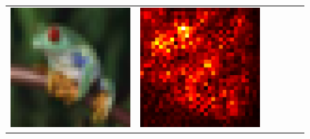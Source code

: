 \documentclass[preprint,12pt]{elsarticle}
\begin{document}
\begin{figure}[p]
\begin{tabular}{cccccc}
  \includegraphics[scale=\scale]{../visualizations/examples/cifar10/resnet18/images/6.png} &
  \includegraphics[scale=\scale]{../visualizations/examples/cifar10/resnet18/saliency_map/6.png} & 

\end{tabular}
\end{figure}
\end{document}
